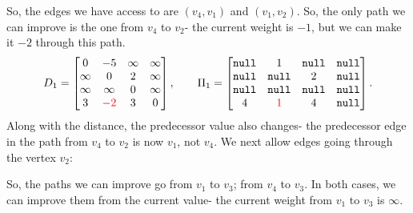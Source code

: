 \documentclass[a4paper, openany]{memoir}
\begin{document}
    \noindent So, the edges we have access to are $(v_4, v_1)$ and $(v_1, v_2)$. So, the only path we can improve is the one from $v_4$ to $v_2$- the current weight is $-1$, but we can make it $-2$ through this path.
    \[D_1 = \begin{bmatrix}
        0 & -5 & \infty & \infty \\
        \infty & 0 & 2 & \infty \\
        \infty & \infty & 0 & \infty \\
        3 & {\color{red} -2} & 3 & 0
    \end{bmatrix}, \qquad \Pi_1 = \begin{bmatrix}
        \texttt{null} & 1 & \texttt{null} & \texttt{null} \\
        \texttt{null} & \texttt{null} & 2 & \texttt{null} \\
        \texttt{null} & \texttt{null} & \texttt{null} & \texttt{null} \\
        4 & {\color{red} 1} & 4 & \texttt{null}
    \end{bmatrix}.\]
    \noindent Along with the distance, the predecessor value also changes- the predecessor edge in the path from $v_4$ to $v_2$ is now $v_1$, not $v_4$. We next allow edges going through the vertex $v_2$:
    \begin{figure}[H]
        \centering
    \end{figure}
    \noindent So, the paths we can improve go from $v_1$ to $v_3$; from $v_4$ to $v_3$. In both cases, we can improve them from the current value- the current weight from $v_1$ to $v_3$ is $\infty$. 
\end{document}
